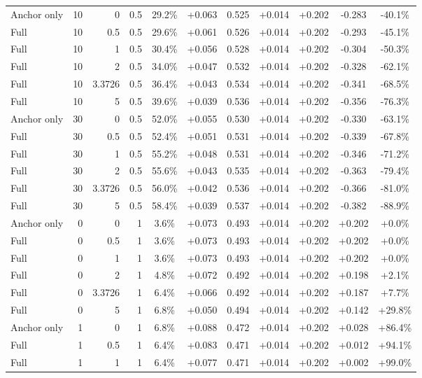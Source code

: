 \begin{table}[htbp]
\begin{tabular}{lrrrccccccc}
Anchor only & 10 & 0 & 0.5 & 29.2\% & +0.063 & 0.525 & +0.014 & +0.202 & -0.283 & -40.1\% \\
Full & 10 & 0.5 & 0.5 & 29.6\% & +0.061 & 0.526 & +0.014 & +0.202 & -0.293 & -45.1\% \\
Full & 10 & 1 & 0.5 & 30.4\% & +0.056 & 0.528 & +0.014 & +0.202 & -0.304 & -50.3\% \\
Full & 10 & 2 & 0.5 & 34.0\% & +0.047 & 0.532 & +0.014 & +0.202 & -0.328 & -62.1\% \\
Full & 10 & 3.3726 & 0.5 & 36.4\% & +0.043 & 0.534 & +0.014 & +0.202 & -0.341 & -68.5\% \\
Full & 10 & 5 & 0.5 & 39.6\% & +0.039 & 0.536 & +0.014 & +0.202 & -0.356 & -76.3\% \\
Anchor only & 30 & 0 & 0.5 & 52.0\% & +0.055 & 0.530 & +0.014 & +0.202 & -0.330 & -63.1\% \\
Full & 30 & 0.5 & 0.5 & 52.4\% & +0.051 & 0.531 & +0.014 & +0.202 & -0.339 & -67.8\% \\
Full & 30 & 1 & 0.5 & 55.2\% & +0.048 & 0.531 & +0.014 & +0.202 & -0.346 & -71.2\% \\
Full & 30 & 2 & 0.5 & 55.6\% & +0.043 & 0.535 & +0.014 & +0.202 & -0.363 & -79.4\% \\
Full & 30 & 3.3726 & 0.5 & 56.0\% & +0.042 & 0.536 & +0.014 & +0.202 & -0.366 & -81.0\% \\
Full & 30 & 5 & 0.5 & 58.4\% & +0.039 & 0.537 & +0.014 & +0.202 & -0.382 & -88.9\% \\
Anchor only & 0 & 0 & 1 & 3.6\% & +0.073 & 0.493 & +0.014 & +0.202 & +0.202 & +0.0\% \\
Full & 0 & 0.5 & 1 & 3.6\% & +0.073 & 0.493 & +0.014 & +0.202 & +0.202 & +0.0\% \\
Full & 0 & 1 & 1 & 3.6\% & +0.073 & 0.493 & +0.014 & +0.202 & +0.202 & +0.0\% \\
Full & 0 & 2 & 1 & 4.8\% & +0.072 & 0.492 & +0.014 & +0.202 & +0.198 & +2.1\% \\
Full & 0 & 3.3726 & 1 & 6.4\% & +0.066 & 0.492 & +0.014 & +0.202 & +0.187 & +7.7\% \\
Full & 0 & 5 & 1 & 6.8\% & +0.050 & 0.494 & +0.014 & +0.202 & +0.142 & +29.8\% \\
Anchor only & 1 & 0 & 1 & 6.8\% & +0.088 & 0.472 & +0.014 & +0.202 & +0.028 & +86.4\% \\
Full & 1 & 0.5 & 1 & 6.4\% & +0.083 & 0.471 & +0.014 & +0.202 & +0.012 & +94.1\% \\
Full & 1 & 1 & 1 & 6.4\% & +0.077 & 0.471 & +0.014 & +0.202 & +0.002 & +99.0\% \\

\end{tabular}
\end{table}
